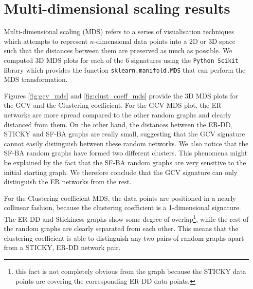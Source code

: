 \section{Multi-dimensional scaling results}

Multi-dimensional scaling (MDS) refers to a series of visualisation techniques which attempts to represent $n$-dimensional data points into a 2D or 3D space such that the distances between them are preserved as much as possible. We computed 3D MDS plots for each of the 6 signatures using the \lstinline|Python Scikit| library which provides the function \lstinline|sklearn.manifold.MDS| that can perform the MDS transformation. 

Figures \ref{fig:gcv_mds} and \ref{fig:clust_coeff_mds} provide the 3D MDS plots for the GCV and the Clustering coefficient. For the GCV MDS plot, the ER networks are more spread compared to the other random graphs and clearly distanced from them. On the other hand, the distances between the ER-DD, STICKY and SF-BA graphs are really small, suggesting that the GCV signature cannot easily distinguish between these random networks. We also notice that the SF-BA random graphs have formed two different clusters. This phenomena might be explained by the fact that the SF-BA random graphs are very sensitive to the initial starting graph.  We therefore conclude that the GCV signature can only distinguish the ER networks from the rest. 

For the Clustering coefficient MDS, the data points are positioned in a nearly collinear fashion, because the clustering coefficient is a 1-dimensional signature. The ER-DD and Stickiness graphs show some degree of overlap\footnote{this fact is not completely obvious from the graph because the STICKY data points are covering the corresponding ER-DD data points.}, while the rest of the random graphs are clearly separated from each other. This means that the clustering coefficient is able to distinguish any two pairs of random graphs apart from a STICKY, ER-DD network pair.


